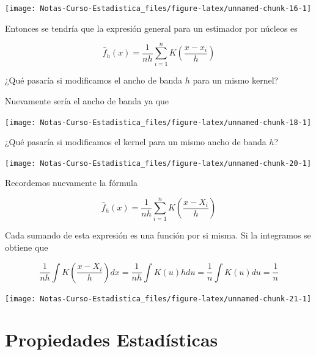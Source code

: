\documentclass[
  12pt,
]{book}
\theoremstyle{definition}
\theoremstyle{definition}
\theoremstyle{definition}
\theoremstyle{remark}
\let\BeginKnitrBlock\begin \let\EndKnitrBlock\end
\begin{document}
\begin{center}\texttt{[image: Notas-Curso-Estadistica\_files/figure-latex/unnamed-chunk-16-1]} \end{center}

Entonces se tendría que la expresión general para un estimador por núcleos es

\begin{equation*}
\hat{f}_{h}\left( x \right) = \frac{1}{nh}\sum_{i=1}^{n} K\left( \frac{x-x_{i}}{h} \right)
\end{equation*}

\BeginKnitrBlock{remark}
{}¿Qué pasaría si modificamos el ancho de banda \(h\) para un mismo kernel?
\EndKnitrBlock{remark}

Nuevamente sería el ancho de banda ya que

\begin{center}\texttt{[image: Notas-Curso-Estadistica\_files/figure-latex/unnamed-chunk-18-1]} \end{center}

\BeginKnitrBlock{remark}
{}¿Qué pasaría si modificamos el kernel para un mismo ancho de banda \(h\)?
\EndKnitrBlock{remark}

\begin{center}\texttt{[image: Notas-Curso-Estadistica\_files/figure-latex/unnamed-chunk-20-1]} \end{center}

Recordemos nuevamente la fórmula

\begin{equation*}
\hat{f}_{h}\left( x \right) = \frac{1}{nh}\sum_{i=1}^{n} K\left( \frac{x-X_{i}}{h} \right)
\end{equation*}

Cada sumando de esta expresión es una función por si misma. Si la integramos se obtiene que

\begin{equation*}
\frac{1}{nh}\int K\left( \frac{x-X_{i}}{h} \right) dx
= \frac{1}{nh} \int K\left( u \right) h du
= \frac{1}{n} \int K(u) du
= \frac{1}{n}
\end{equation*}

\begin{center}\texttt{[image: Notas-Curso-Estadistica\_files/figure-latex/unnamed-chunk-21-1]} \end{center}

\hypertarget{propiedades-estaduxedsticas-1}{%
\section{Propiedades Estadísticas}\label{propiedades-estaduxedsticas-1}}
\end{document}
